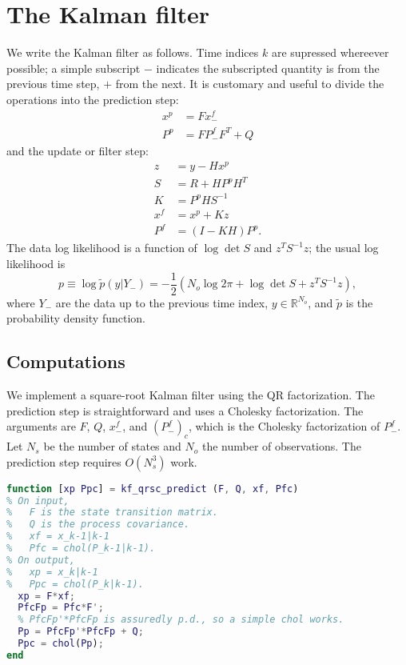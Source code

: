 \documentclass[10pt,fleqn]{article}
\begin{document}
\section{The Kalman filter}
We write the Kalman filter as follows. Time indices $k$ are supressed whereever
possible; a simple subscript $-$ indicates the subscripted quantity is from the
previous time step, $+$ from the next. It is customary and useful to divide the
operations into the prediction step:
\begin{align*}
  x^p &= F x^f_- \\
  P^p &= F P^f_- F^T + Q
\end{align*}
and the update or filter step:
\begin{align*}
  z &= y - H x^p \\
  S &= R + H P^p H^T \\
  K &= P^p H S^{-1} \\
  x^f &= x^p + K z \\
  P^f &= (I - K H) P^p.
\end{align*}
The data log likelihood is a function of $\log \det S$ and $z^T S^{-1} z$; the
usual log likelihood is
\begin{equation} \label{eq:ll}
  p \equiv \log \tilde p(y | Y_-) = -\frac{1}{2}(N_o \log 2 \pi + \log \det S +
  z^T S^{-1} z),
\end{equation}
where $Y_-$ are the data up to the previous time index, $y \in
\mathbb{R}^{N_o}$, and $\tilde p$ is the probability density function.

\subsection{Computations}
We implement a square-root Kalman filter using the QR factorization. The
prediction step is straightforward and uses a Cholesky factorization. The
arguments are $F$, $Q$, $x^f_-$, and $(P^f_-)_c$, which is the Cholesky
factorization of $P^f_-$. Let $N_s$ be the number of states and $N_o$ the number
of observations. The prediction step requires $O(N_s^3)$ work.
\begin{lstlisting}[language=matlab,basicstyle=\footnotesize]
function [xp Ppc] = kf_qrsc_predict (F, Q, xf, Pfc)
% On input,
%   F is the state transition matrix.
%   Q is the process covariance.
%   xf = x_k-1|k-1
%   Pfc = chol(P_k-1|k-1).
% On output,
%   xp = x_k|k-1
%   Ppc = chol(P_k|k-1).
  xp = F*xf;
  PfcFp = Pfc*F';
  % PfcFp'*PfcFp is assuredly p.d., so a simple chol works.
  Pp = PfcFp'*PfcFp + Q;
  Ppc = chol(Pp);
end
\end{lstlisting}
\end{document}
